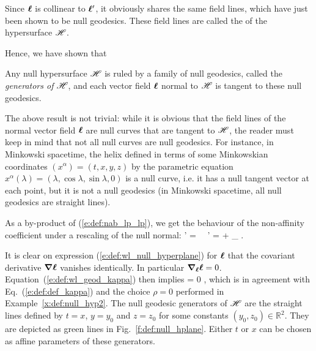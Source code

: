 Since $\bm{\ell}$ is collinear to $\bm{\ell}'$, it obviously shares the same field lines,
which have just been shown to be null geodesics. These field lines are called the
 of the hypersurface $\mathscr{H}$.

Hence, we have shown that
\begin{greybox}
Any null hypersurface $\mathscr{H}$ is ruled by a family of null geodesics, called the
\emph{generators of $\mathscr{H}$}, and each vector field $\bm{\ell}$ normal to $\mathscr{H}$ is
tangent to these null geodesics.
\end{greybox}

\begin{remark}
\label{r:def:null_curves}
The above result is not trivial: while it is obvious that the field lines of the normal
vector field $\bm{\ell}$ are null curves that are tangent to $\mathscr{H}$, the reader must
keep in mind that not all null curves are null geodesics. For instance, in
Minkowski spacetime, the helix defined in terms of
some Minkowskian coordinates $(x^\alpha)=(t,x,y,z)$ by the parametric equation
$x^\alpha(\lambda) = (\lambda, \cos\lambda, \sin\lambda, 0)$ is a null curve, i.e.
it has
a null tangent vector at each point, but it is not a null geodesics (in Minkowski
spacetime, all null geodesics are straight lines).
\end{remark}

As a by-product of (\ref{e:def:nab_lp_lp}), we get the behaviour of the
non-affinity coefficient under a rescaling of the null normal:
\be \label{e:def:rescale_kappa}
    \wl' = \alpha \wl \ \Longrightarrow \ \kappa' = \alpha \kappa + \wnab_{\wl} \alpha .
\ee

\begin{example} \label{x:def:null_hyp3}
It is clear on expression (\ref{e:def:wl_null_hyperplane}) for $\bm{\ell}$ that
the covariant derivative
$\bm{\nabla} \bm{\ell}$ vanishes identically. In particular $\bm{\nabla}_{\bm{\ell}} \bm{\ell} = 0$.
Equation~(\ref{e:def:wl_geod_kappa}) then implies
\be \label{e:def:kappa_0_nullhyp}
    \kappa = 0 ,
\ee
which is in agreement with Eq.~(\ref{e:def:def_kappa}) and the choice $\rho=0$
performed in Example~\ref{x:def:null_hyp2}. The null geodesic generators of $\mathscr{H}$ are the
straight lines defined by $t=x$, $y=y_0$ and $z=z_0$ for some constants
$(y_0,z_0)\in \mathbb{R}^2$.
They are depicted as green lines in Fig.~\ref{f:def:null_hplane}.
 Either $t$ or $x$ can be chosen as affine
parameters of these generators.
\end{example}

